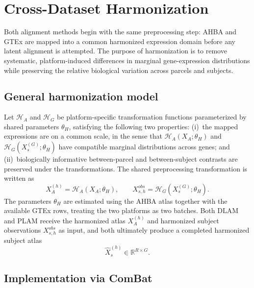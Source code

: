 \documentclass[11pt]{article}
\numberwithin{equation}{section}
\begin{document}
\section{Cross-Dataset Harmonization}
\label{sec:harmonization}

Both alignment methods begin with the same preprocessing step: AHBA and GTEx are
mapped into a common harmonized expression domain before any latent alignment is
attempted.  The purpose of harmonization is to remove systematic, platform-induced
differences in marginal gene-expression distributions while preserving the relative
biological variation across parcels and subjects.

\subsection{General harmonization model}
\label{sec:harmonization-general}

Let $\mathcal{H}_A$ and $\mathcal{H}_G$ be platform-specific transformation functions
parameterized by shared parameters $\theta_H$, satisfying the following two
properties: (i)~the mapped expressions are on a common scale, in the sense that
$\mathcal{H}_A(X_A;\theta_H)$ and $\mathcal{H}_G(X_s^{(G)};\theta_H)$ have compatible
marginal distributions across genes; and (ii)~biologically informative between-parcel
and between-subject contrasts are preserved under the transformations.  The shared
preprocessing transformation is written as
\begin{equation}
  \label{eq:shared-harmonization}
  X_A^{(h)} = \mathcal{H}_A(X_A;\theta_H),
  \qquad
  X_{s,h}^{obs} = \mathcal{H}_G(X_s^{(G)};\theta_H).
\end{equation}
The parameters $\theta_H$ are estimated using the AHBA atlas together with the
available GTEx rows, treating the two platforms as two batches.  Both DLAM and PLAM
receive the harmonized atlas
$X_A^{(h)}$ and harmonized subject observations $X_{s,h}^{obs}$ as input, and both
ultimately produce a completed harmonized subject atlas
\[
  \hat{X}_s^{(h)} \in \mathbb{R}^{R\times G}.
\]

\subsection{Implementation via ComBat}
\label{sec:harmonization-combat}
\end{document}
